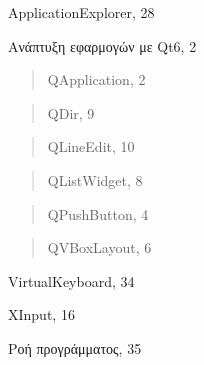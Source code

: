 


ApplicationExplorer, 28

Ανάπτυξη εφαρμογών με Qt6, 2

\begin{quote}
QApplication, 2
\end{quote}


\begin{quote}
QDir, 9
\end{quote}


\begin{quote}
QLineEdit, 10
\end{quote}


\begin{quote}
QListWidget, 8
\end{quote}


\begin{quote}
QPushButton, 4
\end{quote}


\begin{quote}
QVBoxLayout, 6
\end{quote}

VirtualKeyboard, 34

XInput, 16

Ροή προγράμματος, 35
